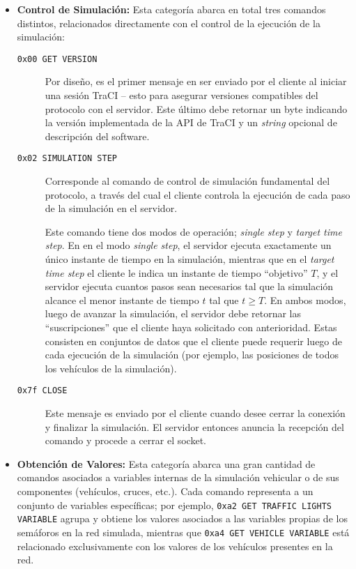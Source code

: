 \begin{itemize}
    \item \textbf{Control de Simulación:} Esta categoría abarca en total tres comandos distintos, relacionados directamente con el control de la ejecución de la simulación:

    \begin{description}
        \item [\texttt{0x00 GET VERSION}] Por diseño, es el primer mensaje en ser enviado por el cliente al iniciar una sesión TraCI -- esto para asegurar versiones compatibles del protocolo con el servidor. Este último debe retornar un byte indicando la versión implementada de la API de TraCI y un \emph{string} opcional de descripción del software.
        
        \item [\texttt{0x02 SIMULATION STEP}] Corresponde al comando de control de simulación fundamental del protocolo, a través del cual el cliente controla la ejecución de cada paso de la simulación en el servidor.
        
        Este comando tiene dos modos de operación; \emph{single step} y \emph{target time step}. En en el modo \emph{single step}, el servidor ejecuta exactamente un único instante de tiempo en la simulación, mientras que en el \emph{target time step} el cliente le indica un instante de tiempo ``objetivo'' $T$, y el servidor ejecuta cuantos pasos sean necesarios tal que la simulación alcance el menor instante de tiempo $t$ tal que $t \geq T$. En ambos modos, luego de avanzar la simulación, el servidor debe retornar las ``suscripciones'' que el cliente haya solicitado con anterioridad. Estas consisten en conjuntos de datos que el cliente puede requerir luego de cada ejecución de la simulación (por ejemplo, las posiciones de todos los vehículos de la simulación).
        
        \item [\texttt{0x7f CLOSE}] Este mensaje es enviado por el cliente cuando desee cerrar la conexión y finalizar la simulación. El servidor entonces anuncia la recepción del comando y procede a cerrar el socket.
    \end{description}
    
    \item \textbf{Obtención de Valores:} Esta categoría abarca una gran cantidad de comandos asociados a variables internas de la simulación vehicular o de sus componentes (vehículos, cruces, etc.). Cada comando representa a un conjunto de variables específicas; por ejemplo, \texttt{0xa2 GET TRAFFIC LIGHTS VARIABLE} agrupa y obtiene los valores asociados a las variables propias de los semáforos en la red simulada, mientras que \texttt{0xa4 GET VEHICLE VARIABLE} está relacionado exclusivamente con los valores de los vehículos presentes en la red.
    

\end{itemize}
